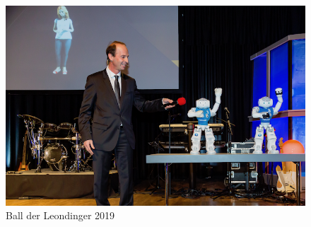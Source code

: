 \documentclass[11pt]{article}
\begin{document}
\begin{figure}
\begin{center}
\includegraphics[scale=0.38]{img/ballDerLeondinger.png}
\end{center}
\caption{Ball der Leondinger 2019}
\label{fig:ballDerLeondinger}
\end{figure}
\end{document}
